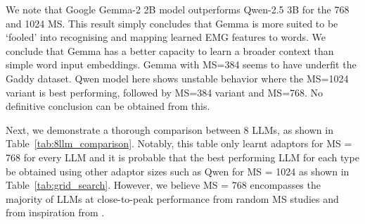 We note that Google Gemma-2 2B model outperforms Qwen-2.5 3B for the 768 and 1024 MS. This result simply concludes that Gemma is more suited to be `fooled' into recognising and mapping learned EMG features to words. We conclude that Gemma has a better capacity to learn a broader context than simple word input embeddings. Gemma with MS=384 seems to have underfit the Gaddy dataset. Qwen model here shows unstable behavior where the MS=1024 variant is best performing, followed by MS=384 variant and MS=768. No definitive conclusion can be obtained from this.

Next, we demonstrate a thorough comparison between 8 LLMs, as shown in Table~\ref{tab:8llm_comparison}. Notably, this table only learnt adaptors for MS = 768 for every LLM and it is probable that the best performing LLM for each type be obtained using other adaptor sizes such as Qwen for MS = 1024 as shown in Table~\ref{tab:grid_search}. However, we believe MS = 768 encompasses the majority of LLMs at close-to-peak performance from random MS studies and from inspiration from \citet{mohapatra2025}.

\begin{table}[ht]
\centering
\caption{Comparison of 8 LLMs with model\_size = 768.}
\label{tab:8llm_comparison}
\end{table}

